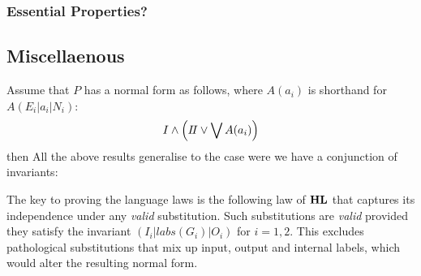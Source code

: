 \subsubsection{Essential Properties?}


\subsection{Miscellaenous}


Assume that $P$ has a normal form as follows,
where $A(a_i)$ is shorthand for $A(E_i|a_i|N_i)$:
\[
   I \land \left( I\!I \lor \bigvee A(a_i) \right)
\]
then
All the above results generalise to the case were we have a conjunction
of invariants:


The key to proving the language laws is the following law of $\mathbf{HL}$
that captures its independence under any \emph{valid} substitution.
Such substitutions are \emph{valid} provided they satisfy the invariant
$(I_i | labs(G_i) | O_i)$ for $i=1,2$.
This excludes pathological substitutions that mix up input, output
and internal labels, which would alter the resulting normal form.
